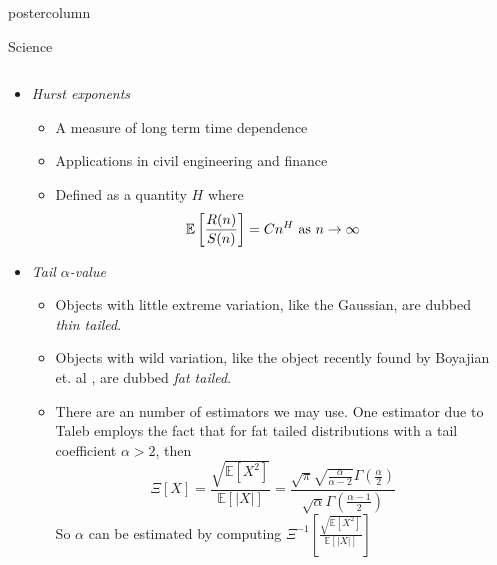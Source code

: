 \documentclass[final,hyperref={pdfpagelabels=false}]{beamer}
\begin{document}
\begin{frame}
\begin{columns}
\begin{column}{.49\textwidth}
\begin{beamercolorbox}[center,wd=\textwidth]{postercolumn}
\begin{minipage}[T]{.95\textwidth}
{\begin{block}{Science}
\begin{columns}
\begin{column}{.70\textwidth}
\begin{itemize}
					\begin{itemize}
						\item \emph{Hurst exponents} \cite{hurst_longterm_1951}
						\begin{itemize}
							\item A measure of long term time dependence
							\item Applications in civil engineering and finance
							\item Defined as a quantity $H$ where
							$$\mathbb{E} \left[\frac{R(n)}{S(n)}\right] = C n^H \textup{ as }n \to \infty$$
						\end{itemize}
						\item \emph{Tail $\alpha$-value}
						\begin{itemize}
							\item Objects with little extreme variation, like the Gaussian, are dubbed \emph{thin tailed}.
							\item Objects with wild variation, like the object recently found by Boyajian et. al \cite{boyajian_planet_2015}, are dubbed \emph{fat tailed}.
							\item There are an number of estimators we may use. One estimator due to Taleb \cite{taleb_silent_2015} employs the fact that for fat tailed distributions with a tail coefficient $\alpha > 2$, then
							$$ \Xi[X] = \frac{\sqrt{\mathbb{E}[X^2]}}{\mathbb{E}[|X|]} = \frac{\sqrt{\pi}\sqrt{\frac{\alpha}{\alpha -2}}\Gamma\left(\frac{\alpha}{2}\right)}{\sqrt{\alpha} \Gamma \left(\frac{\alpha - 1}{2} \right)}$$
							So $\alpha$ can be estimated by computing $\Xi^{-1}\left[\frac{\sqrt{\mathbb{E}[X^2]}}{\mathbb{E}[|X|]}\right]$
						\end{itemize}
					\end{itemize}
		                \end{itemize}
	                \end{column}
	                \begin{column}{.28\textwidth}

\end{column}
\end{columns}
\end{block}}
\end{minipage}
\end{beamercolorbox}
\end{column}
\end{columns}
\end{frame}
\end{document}

